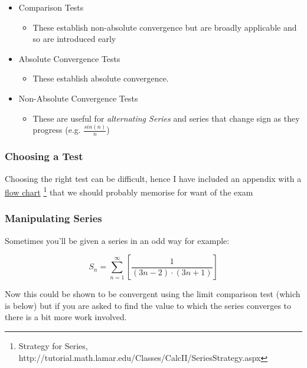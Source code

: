 \documentclass[
]{article}
\begin{document}
\begin{itemize}
\item
  Comparison Tests

  \begin{itemize}
  \item
    These establish non-absolute convergence but are broadly applicable
    and so are introduced early
  \end{itemize}
\item
  Absolute Convergence Tests

  \begin{itemize}
  \item
    These establish absolute convergence.
  \end{itemize}
\item
  Non-Absolute Convergence Tests

  \begin{itemize}
  \item
    These are useful for \emph{alternating Series} and series that
    change sign as they progress (e.g. \(\frac{sin(n)}{n}\))
  \end{itemize}
\end{itemize}

\hypertarget{header-n3203}{%
\subsubsection{Choosing a Test}\label{header-n3203}}

Choosing the right test can be difficult, hence I have included an
appendix with a
\href{http://tutorial.math.lamar.edu/Classes/CalcII/SeriesStrategy.aspx}{flow
chart} \footnote{Strategy for Series,
  http://tutorial.math.lamar.edu/Classes/CalcII/SeriesStrategy.aspx}
that we should probably memorise for want of the exam



\hypertarget{header-n3206}{%
\subsubsection{Manipulating Series}\label{header-n3206}}

Sometimes you'll be given a series in an odd way for example:

\[S_n = \sum^\infty_{n=1} \left[ \frac{1}{(3n-2)\cdot (3n+1)} \right]\]

Now this could be shown to be convergent using the limit comparison test
(which is below) but if you are asked to find the value to which the
series converges to there is a bit more work involved.
\end{document}
